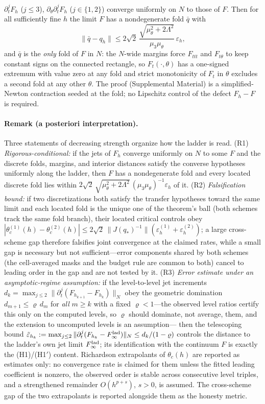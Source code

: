 \(\partial_t^jF_h\) (\(j\le3\)), \(\partial_\theta\partial_t^jF_h\)
(\(j\in\{1,2\}\)) converge uniformly on \(N\) to those of \(F\). Then for all
sufficiently fine \(h\) the limit \(F\) has a nondegenerate fold \(\bar q\)
with
\[
\|\bar q-q_h\|\le
2\sqrt2\,\frac{\sqrt{\mu_\theta^2+2\Lambda^2}}{\mu_3\mu_\theta}\,
\varepsilon_h ,
\]
and \(\bar q\) is the \emph{only} fold of \(F\) in \(N\): the \(N\)-wide
margins force \(F_{ttt}\) and \(F_{t\theta}\) to keep constant signs on the
connected rectangle, so \(F_t(\cdot,\theta)\) has a one-signed extremum
with value zero at any fold and strict monotonicity of \(F_t\) in
\(\theta\) excludes a second fold at any other \(\theta\). The proof (Supplemental
Material) is a simplified-Newton contraction seeded at the fold; no
Lipschitz control of the defect \(F_h-F\) is required.

\paragraph{Remark (a posteriori interpretation).}
Three statements of decreasing strength organize how the ladder is read.
(R1) \emph{Rigorous-conditional:} if the jets of \(F_h\) converge uniformly
on \(N\) to some \(F\) and the discrete folds, margins, and interior
distances satisfy the converse hypotheses uniformly along the ladder, then
\(F\) has a nondegenerate fold and every located discrete fold lies within
\(2\sqrt2\,\sqrt{\mu_\theta^2+2\Lambda^2}\,(\mu_3\mu_\theta)^{-1}
\varepsilon_h\) of it.
(R2) \emph{Falsification bound:} if two discretizations both satisfy the
transfer hypotheses toward the same limit and each located fold is the
unique one of the theorem's ball (both schemes track the same fold branch),
their located critical controls obey
\(|\theta_c^{(1)}(h)-\theta_c^{(2)}(h)|
\le2\sqrt2\,\|J(q_*)^{-1}\|(\varepsilon_h^{(1)}+\varepsilon_h^{(2)})\);
a large cross-scheme gap therefore falsifies joint convergence at the
claimed rates, while a small gap is necessary but not sufficient---error
components shared by both schemes (the cell-averaged masks and the budget
rule are common to both) cancel to leading order in the gap and are not
tested by it.
(R3) \emph{Error estimate under an asymptotic-regime assumption:} if the
level-to-level jet increments
\(d_k=\max_{j\le2}\|\partial_t^j(F_{h_{k+1}}-F_{h_k})\|_N\)
obey the geometric domination \(d_{m+1}\le\varrho\,d_m\) for \emph{all}
\(m\ge k\) with a fixed \(\varrho<1\)---the observed level ratios certify
this only on the computed levels, so \(\varrho\) should dominate, not
average, them, and the extension to uncomputed levels is an assumption---
then the telescoping bound
\(\tilde\varepsilon_{h_k}:=\max_{j\le2}\|\partial_t^j(F_{h_k}-F^{\rm lad}_\infty)\|_N
\le d_k/(1-\varrho)\)
controls the distance to the ladder's own jet limit \(F^{\rm lad}_\infty\);
its identification
with the continuum \(F\) is exactly the (H1)/(H1$'$) content. Richardson
extrapolants of \(\theta_c(h)\) are reported as estimates only: no
convergence rate is claimed for them unless the fitted leading coefficient
is nonzero, the observed order is stable across consecutive level triples,
and a strengthened remainder \(O(h^{p+s})\), \(s>0\), is assumed. The
cross-scheme gap of the two extrapolants is reported alongside them as the
honesty metric.

